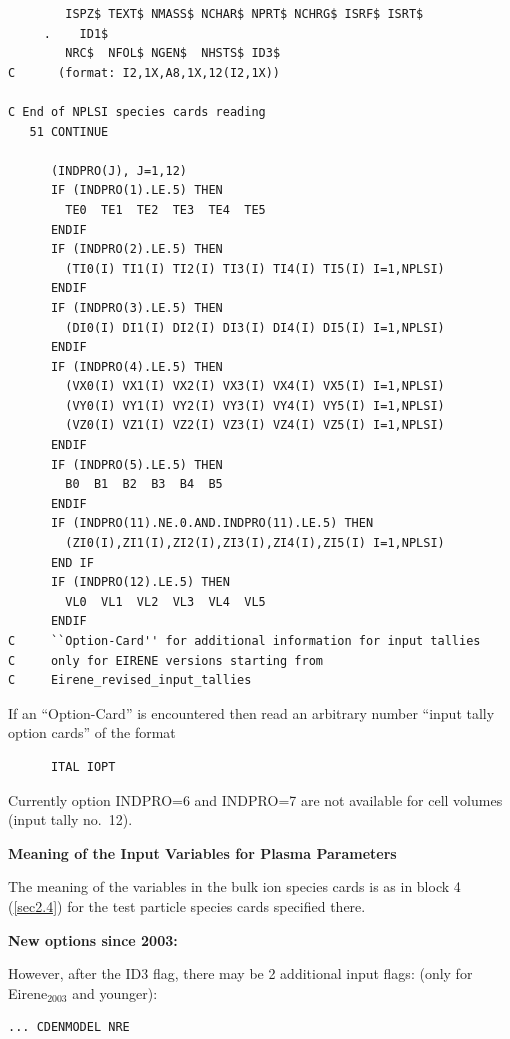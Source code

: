 \begin{lstlisting}
        ISPZ$ TEXT$ NMASS$ NCHAR$ NPRT$ NCHRG$ ISRF$ ISRT$ 
     .    ID1$
        NRC$  NFOL$ NGEN$  NHSTS$ ID3$
C      (format: I2,1X,A8,1X,12(I2,1X))

C End of NPLSI species cards reading
   51 CONTINUE

      (INDPRO(J), J=1,12)
      IF (INDPRO(1).LE.5) THEN
        TE0  TE1  TE2  TE3  TE4  TE5
      ENDIF
      IF (INDPRO(2).LE.5) THEN
        (TI0(I) TI1(I) TI2(I) TI3(I) TI4(I) TI5(I) I=1,NPLSI)
      ENDIF
      IF (INDPRO(3).LE.5) THEN
        (DI0(I) DI1(I) DI2(I) DI3(I) DI4(I) DI5(I) I=1,NPLSI)
      ENDIF
      IF (INDPRO(4).LE.5) THEN
        (VX0(I) VX1(I) VX2(I) VX3(I) VX4(I) VX5(I) I=1,NPLSI)
        (VY0(I) VY1(I) VY2(I) VY3(I) VY4(I) VY5(I) I=1,NPLSI)
        (VZ0(I) VZ1(I) VZ2(I) VZ3(I) VZ4(I) VZ5(I) I=1,NPLSI)
      ENDIF
      IF (INDPRO(5).LE.5) THEN
        B0  B1  B2  B3  B4  B5
      ENDIF
      IF (INDPRO(11).NE.0.AND.INDPRO(11).LE.5) THEN
        (ZI0(I),ZI1(I),ZI2(I),ZI3(I),ZI4(I),ZI5(I) I=1,NPLSI)
      END IF
      IF (INDPRO(12).LE.5) THEN
        VL0  VL1  VL2  VL3  VL4  VL5
      ENDIF
C     ``Option-Card'' for additional information for input tallies
C     only for EIRENE versions starting from
C     Eirene_revised_input_tallies
\end{lstlisting} 

If an ``Option-Card'' is encountered then
read an arbitrary number ``input tally option cards'' of the format

\begin{lstlisting}
      ITAL IOPT
\end{lstlisting} 

Currently option INDPRO=6 and INDPRO=7 are not available for cell volumes
(input tally no.\ 12).

\medskip

\textbf{Meaning of the Input Variables for Plasma Parameters}

\medskip 

The meaning of the variables in the bulk ion species cards is as in block 4
(\cref{sec2.4}) for the test particle species cards specified there.

\textbf{New options since 2003:} 

However, after the ID3 flag, there may be 2 additional input flags: (only for
Eirene$_{2003}$ and younger):

\begin{lstlisting}
... CDENMODEL NRE
\end{lstlisting}

